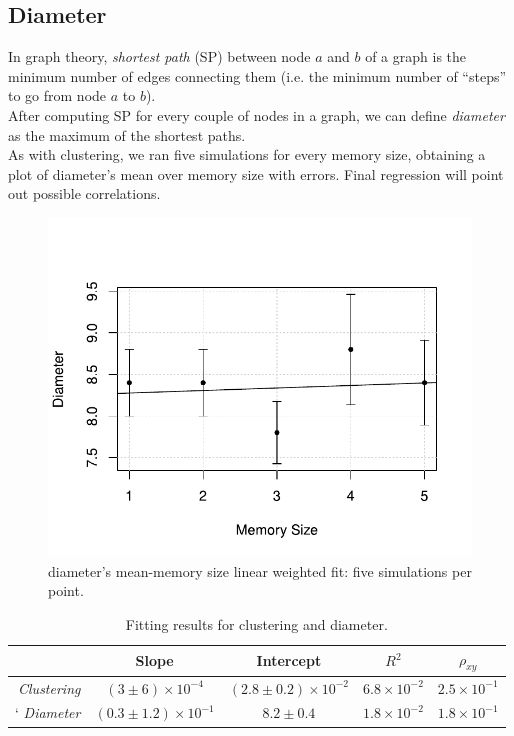 \subsection{Diameter} \label{diameter}
In graph theory, \textit{shortest path}\cite{diameter} (SP)
between node $a$ and $b$ of a graph is the minimum number of
edges connecting them (i.e. the minimum number of ``steps'' to go
from node $a$ to $b$).\\
After computing SP for every couple of nodes in a graph, we can
define \textit{diameter}\cite{diameter} as the maximum of the
shortest paths.\\
As with clustering, we ran five  simulations for every memory
size, obtaining a plot of diameter's mean over memory size with
errors. Final regression will point out possible correlations.
\begin{figure}[h]
  \centering
  \includegraphics[trim={0cm 0cm 0cm 1cm},clip,width=.8\columnwidth]{img/diameter.pdf}
  \caption{diameter's mean-memory size linear weighted fit: five simulations per point.}
  \label{fig:diameter}
\end{figure}
\begin{table}[h]
\label{tab:clusteringdiameter}
\centering
\begin{tabular}{r|cccc}
\toprule
& Slope & Intercept & $R^2$ & $\rho_{xy}$ \\
\midrule
\textit{Clustering} & $(3 \pm 6) \times 10^{-4}$ &$(2.8 \pm 0.2) \times 10^{-2}$ &$6.8 \times 10^{-2}$ & $2.5 \times 10^{-1}$ \\`
\textit{Diameter} & $(0.3 \pm 1.2) \times 10^{-1}$ & $8.2 \pm 0.4$ & $1.8 \times 10^{-2}$ & $1.8 \times 10^{-1}$  \\
\bottomrule
\end{tabular}
\caption{Fitting results for clustering and diameter.}
\end{table}
